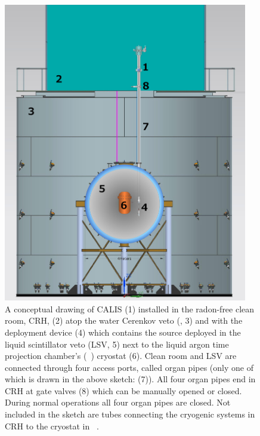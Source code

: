 \begin{figure}[htbp]
 \centering
\includegraphics[width=0.95\textwidth]{Figures/DS50_with_CALIS}
\caption{A conceptual drawing of CALIS (1) installed in the radon-free clean room, CRH, (2) atop the water Cerenkov veto (\wcv, 3) and with the deployment device (4) which contains the source deployed in the liquid scintillator veto (LSV, 5) next to the liquid argon time projection chamber's (\lar\ \tpc) cryostat (6). Clean room and LSV are connected through four access ports, called organ pipes (only one of which is drawn in the above sketch: (7)). All four organ pipes end in CRH at gate valves (8) which can be manually opened or closed. During normal operations all four organ pipes are closed. Not included in the sketch are tubes connecting the cryogenic systems in CRH to the cryostat in \lsv\ \cite{Agnes:2015qyz}.\label{fig:wholeAssembly_insideDetectors}\label{fig:DS50_with_CALIS}}
\end{figure}

